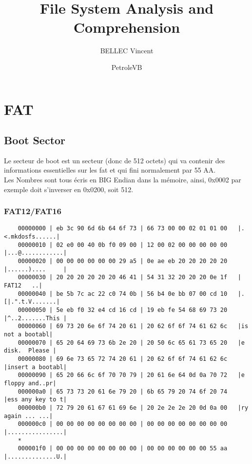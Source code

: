 \documentclass[11pt]{report}
\title{File System Analysis and Comprehension}
\author{BELLEC Vincent \and PetroleVB}
\begin{document}
	
	\maketitle
	\tableofcontents

\chapter{FAT}

\section{Boot Sector}

Le secteur de boot est  un secteur (donc de 512 octets) qui va contenir des informations essentielles sur les fat et qui fini normalement par 55 AA.\\
Les Nombres sont tous écris en BIG Endian dans la mémoire, ainsi, 0x0002 par exemple doit s'inverser en 0x0200, soit 512.\\
\subsection{FAT12/FAT16}

\begin{verbatim}
	00000000 | eb 3c 90 6d 6b 64 6f 73 | 66 73 00 00 02 01 01 00   |.<.mkdosfs......| 
	00000010 | 02 e0 00 40 0b f0 09 00 | 12 00 02 00 00 00 00 00   |...@............| 
	00000020 | 00 00 00 00 00 00 29 a5 | 0e ae eb 20 20 20 20 20   |......)....     | 
	00000030 | 20 20 20 20 20 20 46 41 | 54 31 32 20 20 20 0e 1f   |      FAT12   ..| 
	00000040 | be 5b 7c ac 22 c0 74 0b | 56 b4 0e bb 07 00 cd 10   |.[|.".t.V.......| 
	00000050 | 5e eb f0 32 e4 cd 16 cd | 19 eb fe 54 68 69 73 20   |^..2.......This | 
	00000060 | 69 73 20 6e 6f 74 20 61 | 20 62 6f 6f 74 61 62 6c   |is not a bootabl| 
	00000070 | 65 20 64 69 73 6b 2e 20 | 20 50 6c 65 61 73 65 20   |e disk.  Please |
	00000080 | 69 6e 73 65 72 74 20 61 | 20 62 6f 6f 74 61 62 6c   |insert a bootabl| 
	00000090 | 65 20 66 6c 6f 70 70 79 | 20 61 6e 64 0d 0a 70 72   |e floppy and..pr| 
	000000a0 | 65 73 73 20 61 6e 79 20 | 6b 65 79 20 74 6f 20 74   |ess any key to t| 
	000000b0 | 72 79 20 61 67 61 69 6e | 20 2e 2e 2e 20 0d 0a 00   |ry again ... ...| 
	000000c0 | 00 00 00 00 00 00 00 00 | 00 00 00 00 00 00 00 00   |................| 
	*
	000001f0 | 00 00 00 00 00 00 00 00 | 00 00 00 00 00 00 55 aa   |..............U.| 
\end{verbatim}
\newpage
\end{document}
